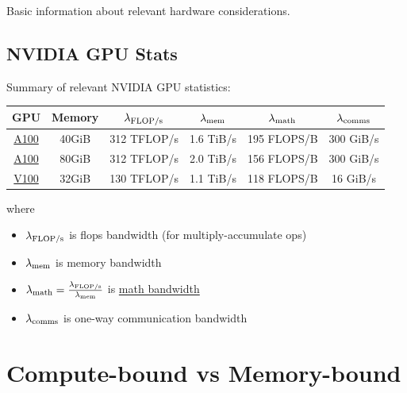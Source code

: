 \documentclass[11pt]{article}
\begin{document}
Basic information about relevant hardware considerations.


\subsection{NVIDIA GPU Stats \label{app_gpu_stats}}


Summary of relevant NVIDIA GPU statistics:
\begin{center}
\begin{tabular}{| c |c| c |c |c| c| }\hline
    GPU & Memory & $ \lambda _{ {\rm FLOP/s }  } $& $ \lambda _{ {\rm mem}  } $  & $ \lambda _{ {\rm math}  } $  & $ \lambda _{ {\rm comms}  } $\\ \hline
    \href{https://www.nvidia.com/content/dam/en-zz/Solutions/Data-Center/a100/pdf/nvidia-a100-datasheet.pdf}{A100}& 40GiB&  312  TFLOP/s &   1.6 TiB/s  & 195 FLOPS/B & 300 GiB/s \\ \hline
    \href{https://www.nvidia.com/content/dam/en-zz/Solutions/Data-Center/a100/pdf/nvidia-a100-datasheet-nvidia-us-2188504-web.pdf}{A100} & 80GiB&  312  TFLOP/s &   2.0 TiB/s  & 156 FLOPS/B & 300 GiB/s \\ \hline
    \href{https://images.nvidia.com/content/technologies/volta/pdf/volta-v100-datasheet-update-us-1165301-r5.pdf}{V100} & 32GiB&  130  TFLOP/s &   1.1 TiB/s  & 118  FLOPS/B & 16 GiB/s \\ \hline
\end{tabular}
\end{center}
where
\begin{itemize}
    \item $ \lambda _{ {\rm  FLOP/s}  } $ is flops bandwidth (for   multiply-accumulate ops)
    \item $ \lambda _{ {\rm  mem}  } $ is memory bandwidth
    \item $ \lambda _{ {\rm  math}  } = \frac{  \lambda _{ {\rm FLOP/s}  } }{ \lambda _{ {\rm mem} } } $ is \href{https://docs.nvidia.com/deeplearning/performance/dl-performance-gpu-background/index.html#gpu-arch}{math bandwidth}
    \item $ \lambda _{ {\rm  comms}  } $ is one-way communication bandwidth
\end{itemize}




\section{Compute-bound vs Memory-bound \label{app_flops_mem_bound} }
\end{document}
